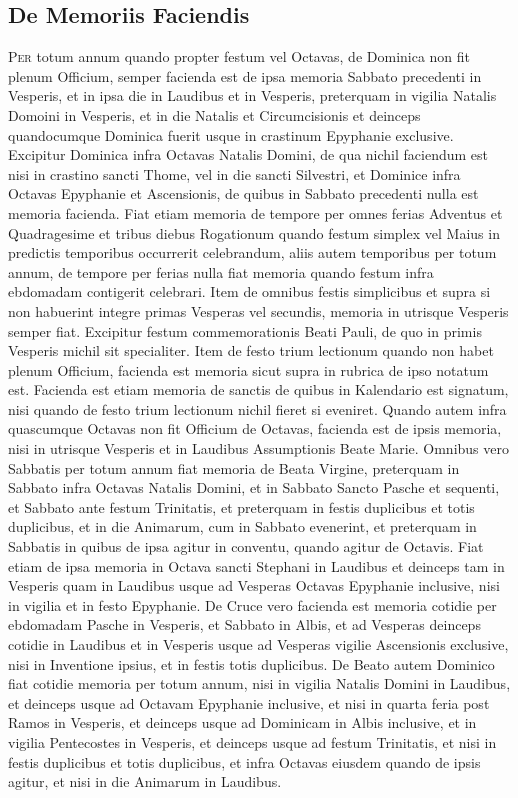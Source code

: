 \documentclass[11pt,openany]{book}
\newcommand*\zallmancaps{\usefont{U}{Zallman}{xl}{n}}
\newcommand{\ubsubsection}[2]{%
	\subsection*{#1}%
	\phantomsection%
	\addcontentsline{toc}{subsection}{#1}%
	\hypertarget{#2}{}%
}
\begin{document}
\begin{multicols*}{2}
{\color{Red} \ubsubsection{De Memoriis Faciendis}{ordinarium-de-memoriis-faciendis}}
\lettrine[lines=2]{\zallmancaps \color{Red} P}{er} totum annum quando propter festum vel Octavas, de Dominica non fit plenum Officium, semper facienda est de ipsa memoria Sabbato precedenti in Vesperis, et in ipsa die in Laudibus et in Vesperis, preterquam in vigilia Natalis Domoini in Vesperis, et in die Natalis et Circumcisionis et deinceps quandocumque Dominica fuerit usque in crastinum Epyphanie exclusive. Excipitur Dominica infra Octavas Natalis Domini, de qua nichil faciendum est nisi in crastino sancti Thome, vel in die sancti Silvestri, et Dominice infra Octavas Epyphanie et Ascensionis, de quibus in Sabbato precedenti nulla est memoria facienda.
Fiat etiam memoria de tempore per omnes ferias
Adventus et Quadragesime et tribus diebus Rogationum quando festum simplex vel Maius in predictis temporibus occurrerit celebrandum, aliis autem temporibus per totum annum, de tempore per ferias nulla fiat memoria quando festum infra ebdomadam contigerit celebrari.
Item de omnibus festis simplicibus et supra si non habuerint integre primas Vesperas vel secundis, memoria in utrisque Vesperis semper fiat. Excipitur festum commemorationis Beati Pauli, de quo in primis Vesperis michil sit specialiter. Item de festo trium lectionum quando non habet plenum Officium, facienda est memoria sicut supra in rubrica de ipso notatum est.
Facienda est etiam memoria de sanctis de quibus in Kalendario est signatum, nisi quando de festo trium lectionum nichil fieret si eveniret. Quando autem infra quascumque Octavas non fit Officium de Octavas, facienda est de ipsis memoria, nisi in utrisque Vesperis et in Laudibus Assumptionis Beate Marie.
Omnibus vero Sabbatis per totum annum fiat memoria de Beata Virgine, preterquam in Sabbato infra Octavas Natalis Domini, et in Sabbato Sancto Pasche et sequenti, et Sabbato ante festum Trinitatis, et preterquam in festis duplicibus et totis duplicibus, et in die Animarum, cum in Sabbato evenerint, et preterquam in Sabbatis in quibus de ipsa agitur in conventu, quando agitur de Octavis.
Fiat etiam de ipsa memoria in Octava sancti Stephani in Laudibus et deinceps tam in Vesperis quam in Laudibus usque ad Vesperas Octavas Epyphanie inclusive, nisi in vigilia et in festo Epyphanie.
De Cruce vero facienda est memoria cotidie per ebdomadam Pasche in Vesperis, et Sabbato in Albis, et ad Vesperas deinceps cotidie in Laudibus et in Vesperis usque ad Vesperas vigilie Ascensionis exclusive, nisi in Inventione ipsius, et in festis totis duplicibus.
De Beato autem Dominico fiat cotidie memoria per totum annum, nisi in vigilia Natalis Domini in Laudibus, et deinceps usque ad Octavam Epyphanie inclusive, et nisi in quarta feria post Ramos in Vesperis, et deinceps usque ad Dominicam in Albis inclusive, et in vigilia Pentecostes in Vesperis, et deinceps usque ad festum Trinitatis, et nisi in festis duplicibus et totis duplicibus, et infra Octavas eiusdem quando de ipsis agitur, et nisi in die Animarum in Laudibus.


\end{multicols*}
\end{document}
